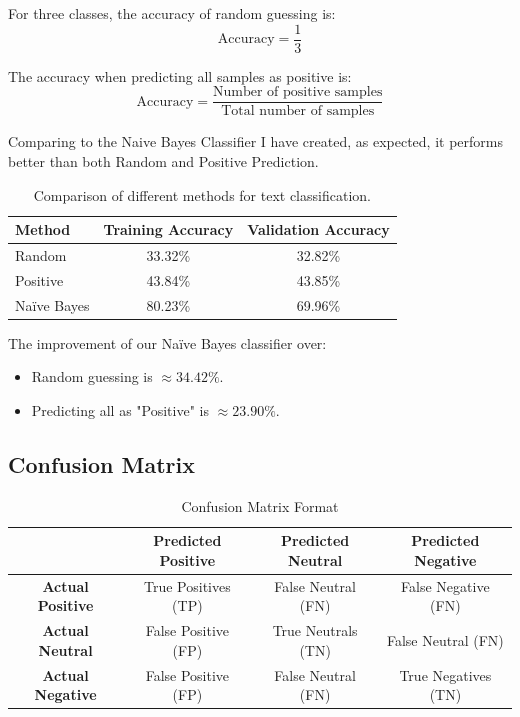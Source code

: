 \documentclass[12pt,a4paper]{article}
\begin{document}
For three classes, the accuracy of random guessing is:
\begin{equation}
\text{Accuracy} = \frac{1}{3}
\end{equation}

The accuracy when predicting all samples as positive is:
\begin{equation}
\text{Accuracy} = \frac{\text{Number of positive samples}}{\text{Total number of samples}}
\end{equation}

Comparing to the Naive Bayes Classifier I have created, as expected, it performs better than both Random and Positive Prediction.

\begin{table}[h]
    \centering
    \begin{tabular}{|l|c|c|}
    \hline
    \textbf{Method} & \textbf{Training Accuracy} & \textbf{Validation Accuracy} \\
    \hline
    Random & 33.32\% & 32.82\% \\
    \hline
    Positive & 43.84\% & 43.85\% \\
    \hline
    Naïve Bayes & 80.23\% & 69.96\% \\
    \hline
    \end{tabular}
    \caption{Comparison of different methods for text classification.}
    \label{tab:comparison}
\end{table}

The improvement of our Naïve Bayes classifier over:
    \begin{itemize}
        \item Random guessing is \( \approx 34.42\% \).
        \item Predicting all as "Positive" is \( \approx 23.90\% \).
    \end{itemize}



\subsection{Confusion Matrix}

\begin{table}[h]
    \centering
    \begin{tabular}{|c|c|c|c|}
    \hline
     & \textbf{Predicted Positive} & \textbf{Predicted Neutral} & \textbf{Predicted Negative} \\
    \hline
    \textbf{Actual Positive} & True Positives (TP) & False Neutral (FN) & False Negative (FN) \\
    \hline
    \textbf{Actual Neutral} & False Positive (FP) & True Neutrals (TN) & False Neutral (FN) \\
    \hline
    \textbf{Actual Negative} & False Positive (FP) & False Neutral (FN) & True Negatives (TN) \\
    \hline
    \end{tabular}
    \caption{Confusion Matrix Format}
    \label{tab:confusion_matrix}
\end{table}
\end{document}
